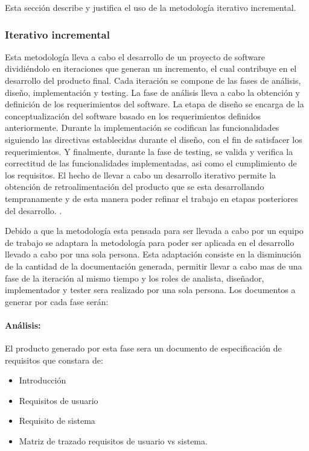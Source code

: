 \documentclass[11pt,letterpaper]{article}
\begin{document}
Esta sección describe y justifica el uso de la metodología iterativo incremental.
\subsubsection{Iterativo incremental}

Esta metodología lleva a cabo el desarrollo de un proyecto de software dividiéndolo en iteraciones que generan un incremento, el cual contribuye en el desarrollo del producto final. Cada iteración se compone de las fases de análisis, diseño, implementación y testing. La fase de análisis lleva a cabo la obtención y definición de los requerimientos del software. La etapa de diseño se encarga de la conceptualización del software basado en los requerimientos definidos anteriormente. Durante la implementación se codifican las funcionalidades siguiendo las directivas establecidas durante el diseño, con el fin de satisfacer los requerimientos. Y finalmente, durante la fase de testing, se valida y verifica la correctitud de las funcionalidades implementadas, asi como el cumplimiento de los requisitos. El hecho de llevar a cabo un desarrollo iterativo permite la obtención de retroalimentación del producto que se esta desarrollando tempranamente y de esta manera poder refinar el trabajo en etapas posteriores del desarrollo. \cite{Victor2003, Mitchell2009, Martin1999,Alshamrani2015}.

Debido a que la metodología esta pensada para ser llevada a cabo por un equipo de trabajo se adaptara la metodología para poder ser aplicada en el desarrollo llevado a cabo por una sola persona. Esta adaptación consiste en la disminución de la cantidad de la documentación generada, permitir llevar a cabo mas de una fase de la iteración al mismo tiempo y los roles de analista, diseñador, implementador y tester sera realizado por una sola persona. Los documentos a generar por cada fase serán:

\paragraph{Análisis:} El producto generado por esta fase sera un documento de especificación de requisitos que constara de:
\begin{itemize}
	\item Introducción
	\item Requisitos de usuario
	\item Requisito de sistema
	\item Matriz de trazado requisitos de usuario vs sistema.
\end{itemize}
\end{document}
